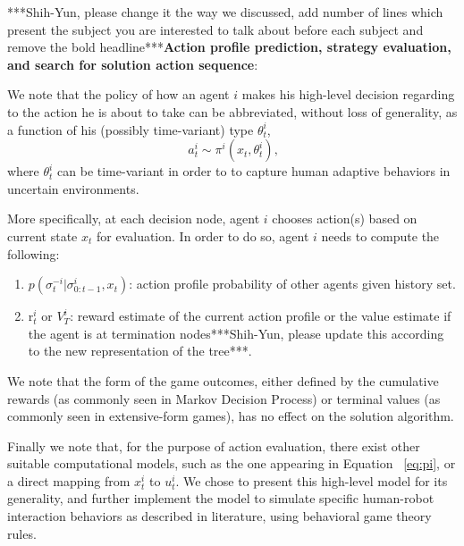 \documentclass[letterpaper, 10 pt, conference]{ieeeconf}  %
\begin{document}
***Shih-Yun, please change it the way we discussed, add number of lines which present the subject you are interested to talk about before each subject and remove the bold headline***\textbf{Action profile prediction, strategy evaluation, and search for 
solution action sequence}:

We note that the policy of how an agent $i$ makes his high-level decision regarding to the action he is about to take can be abbreviated, without loss of generality, as a function of his (possibly time-variant) type $\theta^i_t$,
\begin{equation}~\label{eq:pi}
a^i_t \sim \pi^i(x_t,\theta^i_t),
\end{equation}
where $\theta^i_t$ can be time-variant in order to to capture human adaptive behaviors in uncertain environments.  

More specifically, at each decision node, agent $i$ chooses action(s) based on 
current state $x_t$ for evaluation. In order to do so, agent $i$ needs to 
compute the following:
\begin{enumerate}
  \item $p(\sigma^{-i}_t|\sigma^i_{0:t-1},x_t)$: action profile probability of other 
    agents given history set.
  \item r$^i_t$ or $V^i_T$: reward estimate of the current action profile or the value estimate if the agent is at termination nodes***Shih-Yun, please update this according to the new representation of the tree***.
\end{enumerate}
We note that the form of the game outcomes, either defined by the cumulative 
rewards (as commonly seen in Markov Decision Process) or terminal values (as 
commonly seen in extensive-form games), has no effect on the solution algorithm. 

Finally we note that, for the purpose of action evaluation, there exist other suitable computational models, such as the one appearing in Equation ~\ref{eq:pi}, or a direct mapping from $x^i_t$ to $u^i_t$. We chose to present this high-level model for its generality, and further implement the model to simulate specific human-robot interaction behaviors as described in literature, using behavioral game theory rules.  
\end{document}
